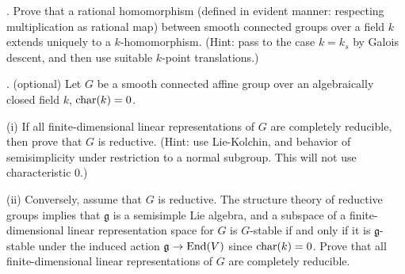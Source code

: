 \documentclass[10pt]{amsart}
\begin{document}
  \medskip{}.  Prove that a rational homomorphism (defined in evident manner: respecting multiplication
  as rational map) between smooth connected groups over a field $k$ extends uniquely to
  a $k$-homomorphism. (Hint: pass to the case $k = k_s$ by Galois descent, and then use suitable
  $k$-point translations.)
  
\medskip{}. (optional) Let $G$ be a smooth connected affine group over an algebraically closed
field $k$, ${\rm{char}}(k)=0$. 

(i) If all finite-dimensional linear representations of $G$ are completely reducible, then prove
that $G$ is reductive.  (Hint: use Lie-Kolchin, and behavior of semisimplicity under restriction
to a normal subgroup.  This will not use characteristic 0.)

(ii) Conversely, assume that $G$ is reductive. The structure theory of reductive groups implies that 
$\mathfrak{g}$ is a semisimple Lie algebra, and a subspace of a finite-dimensional linear
representation space for $G$ is $G$-stable if and only if it is $\mathfrak{g}$-stable under the induced action
$\mathfrak{g} \rightarrow {\rm{End}}(V)$ since ${\rm{char}}(k) = 0$.  
Prove that all finite-dimensional linear representations
of $G$ are completely reducible.
\end{document}
